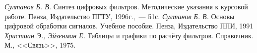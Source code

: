 \begin{thebibliography}{99}
 \emph{Султанов Б. В.} Синтез цифровых
  фильтров. Методические указания к курсовой работе. Пенза,
  Издательство ПГТУ, 1996г.,~--- 51с.
 \emph{Султанов Б. В.} Основы цифровой обработки
  сигналов. Учебное пособие. Пенза, Издательство ППИ, 1991
 \emph{Христиан Э., Эйзенман Е.} Таблицы и графики
  по расчёту фильтров. Справочник. М., <<Связь>>, 1975.
\end{thebibliography}
